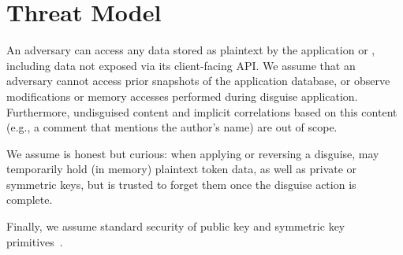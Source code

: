 
\section{Threat Model}
An adversary can access any data stored as plaintext by the application or \sys, including data not
exposed via its client-facing API. We assume that an adversary cannot access prior snapshots of the
application database, or observe modifications or memory accesses performed during disguise
application. Furthermore, undisguised content and implicit correlations based on this content (e.g.,
a comment that mentions the author’s name) are out of scope.

We assume \sys is honest but curious: when applying or reversing a disguise, \sys may temporarily
hold (in memory) plaintext token data, as well as private or symmetric keys, but is trusted to
forget them once the disguise action is complete.  

Finally, we assume standard security of public key and symmetric key primitives~.

